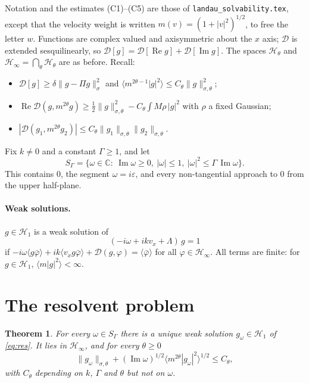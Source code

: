 \documentclass[11pt]{article}
\newcommand{\cD}{\mathcal{D}}
\newcommand{\cH}{\mathcal{H}}
\newcommand{\avg}[1]{\langle #1\rangle}
\renewcommand{\Re}{\operatorname{Re}}
\renewcommand{\Im}{\operatorname{Im}}
\newtheorem{theorem}{Theorem}
\theoremstyle{remark}
\begin{document}
Notation and the estimates (C1)--(C5) are those of
\texttt{landau\_solvability.tex}, except that the velocity weight is written
$m(v)=(1+|v|^2)^{1/2}$, to free the letter $w$. Functions are complex valued
and axisymmetric about the $x$ axis; $\cD$ is extended sesquilinearly, so
$\cD[g]=\cD[\Re g]+\cD[\Im g]$. The spaces $\cH_\theta$ and
$\cH_\infty=\bigcap_\theta\cH_\theta$ are as before. Recall:
\begin{itemize}
  \item $\cD[g]\ge\delta\|g-\Pi g\|^2_\sigma$ and
    $\avg{m^{2\theta-1}|g|^2}\le C_\theta\|g\|^2_{\sigma,\theta}$;
  \item $\Re\cD(g,m^{2\theta}g)\ge\tfrac12\|g\|^2_{\sigma,\theta}
    -C_\theta\int M\rho\,|g|^2$ with $\rho$ a fixed Gaussian;
  \item $|\cD(g_1,m^{2\theta}g_2)|\le C_\theta\|g_1\|_{\sigma,\theta}\|g_2\|_{\sigma,\theta}$.
\end{itemize}
Fix $k\ne0$ and a constant $\Gamma\ge1$, and let
\[
  S_\Gamma=\{\omega\in\mathbb{C}:\ \Im\omega\ge0,\ |\omega|\le1,\
  |\omega|^2\le\Gamma\,\Im\omega\}.
\]
This contains $0$, the segment $\omega=i\varepsilon$, and every non-tangential
approach to $0$ from the upper half-plane.

\paragraph{Weak solutions.} $g\in\cH_1$ is a weak solution of
\begin{equation}
  (-i\omega+ikv_x+\Lambda)\,g=1
  \label{eq:res}
\end{equation}
if $-i\omega\avg{g\bar\varphi}+ik\avg{v_xg\bar\varphi}+\cD(g,\varphi)
=\avg{\bar\varphi}$ for all $\varphi\in\cH_\infty$. All terms are finite: for
$g\in\cH_1$, $\avg{m|g|^2}<\infty$.

\section{The resolvent problem}

\begin{theorem}\label{thm:res}
For every $\omega\in S_\Gamma$ there is a unique weak solution
$g_\omega\in\cH_1$ of \eqref{eq:res}. It lies in $\cH_\infty$, and for every
$\theta\ge0$
\begin{equation}
  \|g_\omega\|_{\sigma,\theta}+(\Im\omega)^{1/2}\avg{m^{2\theta}|g_\omega|^2}^{1/2}
  \le C_\theta ,
  \label{eq:unif}
\end{equation}
with $C_\theta$ depending on $k$, $\Gamma$ and $\theta$ but not on $\omega$.
\end{theorem}
\end{document}
